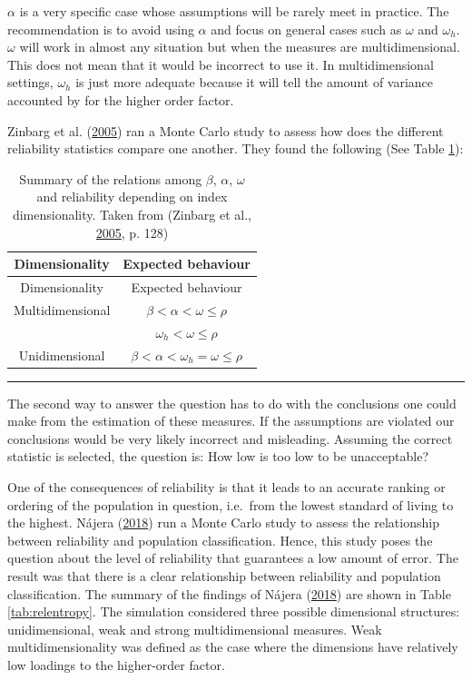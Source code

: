 \documentclass[]{book}
\begin{document}
\(\alpha\) is a very specific case whose assumptions will be rarely meet in practice. The recommendation is to avoid using \(\alpha\) and focus on general cases such as \(\omega\) and \(\omega_h\). \(\omega\) will work in almost any situation but when the measures are multidimensional. This does not mean that it would be incorrect to use it. In multidimensional settings, \(\omega_h\) is just more adequate because it will tell the amount of variance accounted by for the higher order factor.

Zinbarg et al. (\protect\hyperlink{ref-Zinbarg2005}{2005}) ran a Monte Carlo study to assess how does the different reliability statistics compare one another. They found the following (See Table \ref{tab:reliabilitystats}):

\begin{longtable}[]{@{}cc@{}}
\caption{\label{tab:reliabilitystats} Summary of the relations among \(\beta\), \(\alpha\), \(\omega\) and
reliability depending on index dimensionality. Taken from (Zinbarg et al., \protect\hyperlink{ref-Zinbarg2005}{2005}, p. 128)}\tabularnewline
\toprule
Dimensionality & Expected behaviour\tabularnewline
\midrule
\endfirsthead
\toprule
Dimensionality & Expected behaviour\tabularnewline
\midrule
\endhead
Multidimensional & \(\beta<\alpha<\omega\leq\rho\)\tabularnewline
& \(\omega_h<\omega\leq\rho\)\tabularnewline
Unidimensional & \(\beta<\alpha<\omega_h=\omega\leq\rho\)\tabularnewline
\bottomrule
\end{longtable}

\begin{center}\rule{0.5\linewidth}{\linethickness}\end{center}

The second way to answer the question has to do with the conclusions one could make from the estimation of these measures. If the assumptions are violated our conclusions would be very likely incorrect and misleading. Assuming the correct statistic is selected, the question is: How low is too low to be unacceptable?

One of the consequences of reliability is that it leads to an accurate ranking or ordering of the population in question, i.e.~from the lowest standard of living to the highest. Nájera (\protect\hyperlink{ref-Najera2018}{2018}) run a Monte Carlo study to assess the relationship between reliability and population classification. Hence, this study poses the question about the level of reliability that guarantees a low amount of error. The result was that there is a clear relationship between reliability and population classification. The summary of the findings of Nájera (\protect\hyperlink{ref-Najera2018}{2018}) are shown in Table \ref{tab:relentropy}. The simulation considered three possible dimensional structures: unidimensional, weak and strong multidimensional measures. Weak multidimensionality was defined as the case where the dimensions have relatively low loadings to the higher-order factor.
\end{document}
